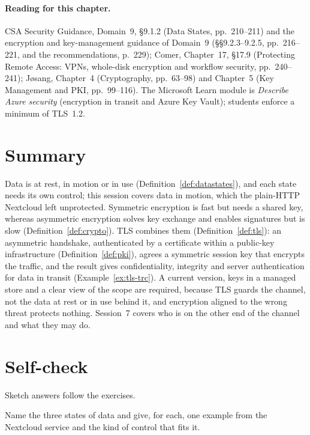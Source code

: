 \paragraph{Reading for this chapter.} CSA Security Guidance, Domain~9,
\S9.1.2 (Data States, pp.~210--211) and the encryption and key-management
guidance of Domain~9 (\S\S9.2.3--9.2.5, pp.~216--221, and the
recommendations, p.~229); Comer, Chapter~17, \S17.9 (Protecting Remote
Access: VPNs, whole-disk encryption and workflow security, pp.~240--241);
J\o sang, Chapter~4 (Cryptography, pp.~63--98) and Chapter~5 (Key Management and PKI, pp.~99--116).
The Microsoft Learn module is \emph{Describe Azure security} (encryption in
transit and Azure Key Vault); students enforce a minimum of TLS~1.2.

\section{Summary}

Data is at rest, in motion or in use (Definition~\ref{def:datastates}), and
each state needs its own control; this session covers data in motion, which
the plain-HTTP Nextcloud left unprotected. Symmetric encryption is fast but
needs a shared key, whereas asymmetric encryption solves key exchange and
enables signatures but is slow (Definition~\ref{def:crypto}). TLS combines
them (Definition~\ref{def:tls}): an asymmetric handshake, authenticated by a
certificate within a public-key infrastructure (Definition~\ref{def:pki}),
agrees a symmetric session key that encrypts the traffic, and the result
gives confidentiality, integrity and server authentication for data in
transit (Example~\ref{ex:tls-trc}). A current version, keys in a managed
store and a clear view of the scope are required, because TLS guards the
channel, not the data at rest or in use behind it, and encryption aligned to
the wrong threat protects nothing. Session~7 covers who is on the other end
of the channel and what they may do.

\section*{Self-check}

Sketch answers follow the exercises.

\begin{exercise}
Name the three states of data and give, for each, one example from the
Nextcloud service and the kind of control that fits it.
\end{exercise}

